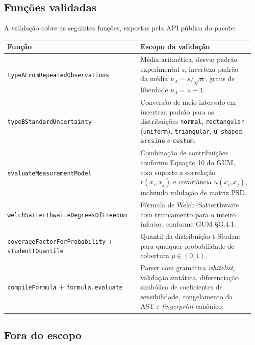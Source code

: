 \documentclass[11pt,a4paper]{article}
\begin{document}
\subsection{Funções validadas}

A validação cobre as seguintes funções, expostas pela API pública do pacote:

\begin{table}[h]
  \centering
  \small
  \begin{tabularx}{\textwidth}{l X}
    \toprule
    \textbf{Função} & \textbf{Escopo da validação} \\
    \midrule
    \texttt{typeAFromRepeatedObservations} & Média aritmética, desvio padrão experimental \(s\), incerteza padrão da média \(u_A = s/\sqrt{n}\), graus de liberdade \(\nu_A = n - 1\). \\
    \texttt{typeBStandardUncertainty} & Conversão de meio-intervalo em incerteza padrão para as distribuições \texttt{normal}, \texttt{rectangular} (\texttt{uniform}), \texttt{triangular}, \texttt{u-shaped}, \texttt{arcsine} e \texttt{custom}. \\
    \texttt{evaluateMeasurementModel} & Combinação de contribuições conforme Equação 10 do GUM, com suporte a correlação \(r(x_i, x_j)\) e covariância \(u(x_i, x_j)\), incluindo validação de matriz PSD. \\
    \texttt{welchSatterthwaiteDegreesOfFreedom} & Fórmula de Welch--Satterthwaite com truncamento para o inteiro inferior, conforme GUM §G.4.1. \\
    \texttt{coverageFactorForProbability} + \texttt{studentTQuantile} & Quantil da distribuição t-Student para qualquer probabilidade de cobertura \(p \in (0,1)\). \\
    \texttt{compileFormula} + \texttt{formula.evaluate} & Parser com gramática \emph{whitelist}, validação sintática, diferenciação simbólica de coeficientes de sensibilidade, congelamento da AST e \emph{fingerprint} canônico. \\
    \bottomrule
  \end{tabularx}
\end{table}

\subsection{Fora do escopo}
\end{document}
